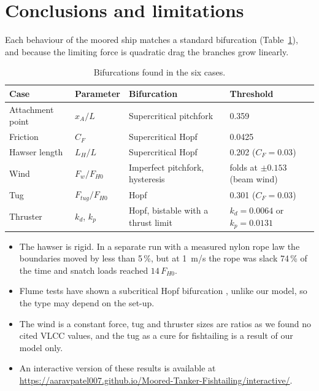 \documentclass[11pt,a4paper]{article}
\newcommand{\FHz}{F_{H0}}
\begin{document}
\section{Conclusions and limitations}
Each behaviour of the moored ship matches a standard bifurcation (Table~\ref{tab:summary}), and because the limiting
force is quadratic drag the branches grow linearly.
\begin{table}[H]
\centering\footnotesize
\caption{Bifurcations found in the six cases.}
\label{tab:summary}
\begin{tabular}{@{}llll@{}}
\toprule
Case & Parameter & Bifurcation & Threshold\\
\midrule
Attachment point & $x_A/L$ & Supercritical pitchfork & 0.359\\
Friction & $C_F$ & Supercritical Hopf & 0.0425\\
Hawser length & $L_H/L$ & Supercritical Hopf & 0.202 ($C_F=0.03$)\\
Wind & $F_w/\FHz$ & Imperfect pitchfork, hysteresis & folds at $\pm0.153$ (beam wind)\\
Tug & $F_{tug}/\FHz$ & Hopf & 0.301 ($C_F=0.03$)\\
Thruster & $k_d$, $k_p$ & Hopf, bistable with a thrust limit & $k_d=0.0064$ or $k_p=0.0131$\\
\bottomrule
\end{tabular}
\end{table}
\begin{itemize}
\item The hawser is rigid. In a separate run with a measured nylon rope law \cite{huang} the boundaries moved by less
than 5\,\%, but at 1~m/s the rope was slack 74\,\% of the time and snatch loads reached $14\,\FHz$.
\item Flume tests have shown a subcritical Hopf bifurcation \cite{aghamohammadi}, unlike our model, so the type may
depend on the set-up.
\item The wind is a constant force, tug and thruster sizes are ratios as we found no cited VLCC values, and the tug
as a cure for fishtailing is a result of our model only.
\item An interactive version of these results is available at\\
\url{https://aaravpatel007.github.io/Moored-Tanker-Fishtailing/interactive/}.
\end{itemize}
\end{document}
